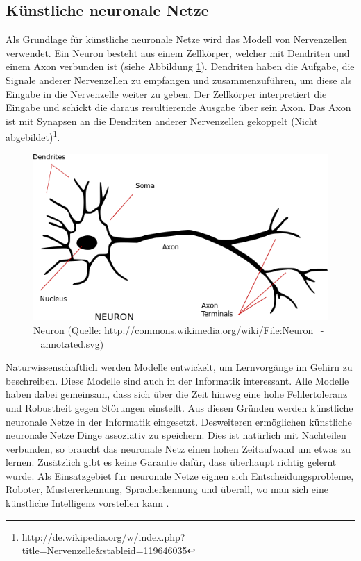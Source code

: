 \documentclass[12pt]{article}
\begin{document}
	\subsection{Künstliche neuronale Netze}
	\label{NN}
		Als Grundlage für künstliche neuronale Netze wird das Modell von Nervenzellen verwendet. Ein Neuron besteht aus einem Zellkörper, welcher mit Dendriten und einem Axon verbunden ist (siehe Abbildung \ref{Neuron}). Dendriten haben die Aufgabe, die Signale anderer Nervenzellen zu empfangen und zusammenzuführen, um diese als Eingabe in die Nervenzelle weiter zu geben. Der Zellkörper interpretiert die Eingabe und schickt die daraus resultierende Ausgabe über sein Axon. Das Axon ist mit Synapsen an die Dendriten anderer Nervenzellen gekoppelt (Nicht abgebildet)\footnote{http://de.wikipedia.org/w/index.php?title=Nervenzelle\&stableid=119646035}.
\begin{figure}[H]
	\includegraphics[scale=0.8]{Neuron_-_annotated.png}
	\caption{Neuron (Quelle: http://commons.wikimedia.org/wiki/File:Neuron\_-\_annotated.svg) }
	\label{Neuron}
\end{figure}		
		
	Naturwissenschaftlich werden Modelle entwickelt, um Lernvorgänge im Gehirn zu beschreiben. Diese Modelle sind auch in der Informatik interessant. Alle Modelle haben dabei gemeinsam, dass sich über die Zeit hinweg eine hohe Fehlertoleranz und Robustheit gegen Störungen einstellt. Aus diesen Gründen werden künstliche neuronale Netze in der Informatik eingesetzt.
	 Desweiteren ermöglichen künstliche neuronale Netze Dinge assoziativ zu speichern. Dies ist natürlich mit Nachteilen verbunden, so braucht das neuronale Netz einen hohen Zeitaufwand um etwas zu lernen. Zusätzlich gibt es keine Garantie dafür, dass überhaupt richtig gelernt wurde. Als Einsatzgebiet für neuronale Netze eignen sich Entscheidungsprobleme, Roboter, Mustererkennung, Spracherkennung und überall, wo man sich eine künstliche Intelligenz vorstellen kann \cite{PDP}.
	
\end{document}
